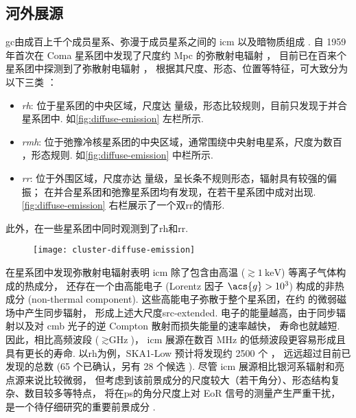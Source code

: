 \subsection{河外展源}
\label{sec:eg-extended}

\ac{gc}由成百上千个成员星系、弥漫于成员星系之间的 \ac{icm} 以及暗物质组成
\cite{sarazin1986,bohringer2010}.
自 1959 年首次在 Coma 星系团中发现了尺度约 \si{Mpc} 的弥散射电辐射 \cite{large1959}，
目前已在百来个星系团中探测到了弥散射电辐射 \cite{feretti2012,vanWeeren2019}，
根据其尺度、形态、位置等特征，可大致分为以下三类
\cite{feretti2012,kale2016}：
\begin{itemize}
  \item \emph{\acf{rh}}:
    位于星系团的中央区域，尺度达 \si{\Mpc} 量级，形态比较规则，目前只发现于并合星系团中.
    如\autoref{fig:diffuse-emission} 左栏所示.
  \item \emph{\acf{rmh}}:
    位于弛豫冷核星系团的中央区域，通常围绕中央射电星系，尺度为数百 \si{\kpc}，形态规则.
    如\autoref{fig:diffuse-emission} 中栏所示.
  \item \emph{\acf{rr}}:
    位于外围区域，尺度亦达 \si{\Mpc} 量级，呈长条不规则形态，辐射具有较强的偏振；
    在并合星系团和弛豫星系团均有发现，在若干星系团中成对出现.
    \autoref{fig:diffuse-emission} 右栏展示了一个双\ac{rr}的情形.
\end{itemize}
此外，在一些星系团中同时观测到了\ac{rh}和\ac{rr}.

\begin{figure}[tbp]
  \centering
  \texttt{[image: cluster-diffuse-emission]}
  \label{fig:diffuse-emission}
\end{figure}

在星系团中发现弥散射电辐射表明
\ac{icm} 除了包含由高温 ($\gtrsim \SI{1}{\keV}$) 等离子气体构成的热成分，
还存在一个由高能电子 (Lorentz 因子 $\acs{g} > \num{e3}$) 构成的非热成分
(non-thermal component).
这些高能电子弥散于整个星系团，在约 \si{\uG} 的微弱磁场中产生同步辐射，
形成上述大尺度\ac{src-extended}.
电子的能量越高，由于同步辐射以及对 \ac{cmb} 光子的逆 Compton 散射而损失能量的速率越快，
寿命也就越短.
因此，相比高频波段 ($\gtrsim\si{\GHz}$)，
\ac{icm} 展源在数百 MHz 的低频波段更容易形成且具有更长的寿命.
以\ac{rh}为例，SKA1-Low 预计将发现约 2500 个 \cite{cassano2015}，
远远超过目前已发现的总数 (65 个已确认，另有 28 个候选 \cite{vanWeeren2019}).
尽管 \ac{icm} 展源相比银河系辐射和亮点源来说比较微弱，
但考虑到该前景成分的尺度较大（若干角分）、形态结构复杂、数目较多等特点，
将在\ac{ps}的角分尺度上对 EoR 信号的测量产生严重干扰，
是一个待仔细研究的重要前景成分 \cite{diMatteo2004,gleser2008}.

